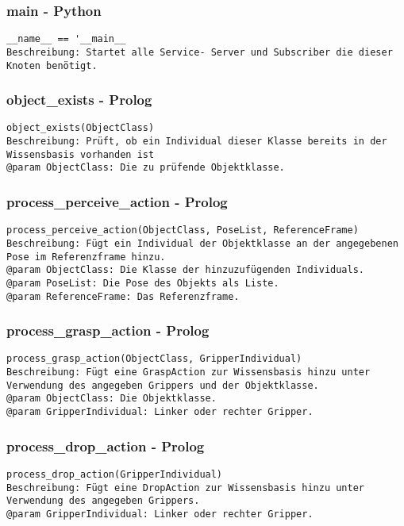 \documentclass{suturo}
\begin{document}
\subsubsection{main - Python}
\begin{verbatim}
__name__ == '__main__
Beschreibung: Startet alle Service- Server und Subscriber die dieser Knoten benötigt.
\end{verbatim}

\subsubsection{object\_exists - Prolog}
\begin{verbatim}
object_exists(ObjectClass)
Beschreibung: Prüft, ob ein Individual dieser Klasse bereits in der
Wissensbasis vorhanden ist
@param ObjectClass: Die zu prüfende Objektklasse.
\end{verbatim}

\subsubsection{process\_perceive\_action - Prolog}
\begin{verbatim}
process_perceive_action(ObjectClass, PoseList, ReferenceFrame)
Beschreibung: Fügt ein Individual der Objektklasse an der angegebenen 
Pose im Referenzframe hinzu.
@param ObjectClass: Die Klasse der hinzuzufügenden Individuals.
@param PoseList: Die Pose des Objekts als Liste.
@param ReferenceFrame: Das Referenzframe.
\end{verbatim}

\subsubsection{process\_grasp\_action - Prolog}
\begin{verbatim}
process_grasp_action(ObjectClass, GripperIndividual)
Beschreibung: Fügt eine GraspAction zur Wissensbasis hinzu unter 
Verwendung des angegeben Grippers und der Objektklasse.
@param ObjectClass: Die Objektklasse.
@param GripperIndividual: Linker oder rechter Gripper.
\end{verbatim}

\subsubsection{process\_drop\_action - Prolog}
\begin{verbatim}
process_drop_action(GripperIndividual)
Beschreibung: Fügt eine DropAction zur Wissensbasis hinzu unter 
Verwendung des angegeben Grippers.
@param GripperIndividual: Linker oder rechter Gripper.
\end{verbatim}
\end{document}
